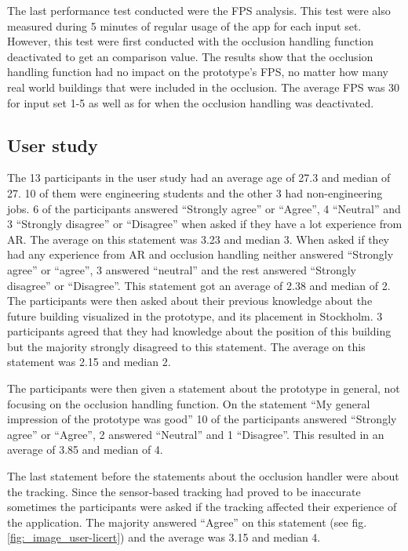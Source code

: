 The last performance test conducted were the FPS analysis. This test were also measured during 5 minutes of regular usage of the app for each input set. However, this test were first conducted with the occlusion handling function deactivated to get an comparison value. The results show that the occlusion handling function had no impact on the prototype's FPS, no matter how many real world buildings that were included in the occlusion. The average FPS was 30 for input set 1-5 as well as for when the occlusion handling was deactivated.

\subsection{User study}

The 13 participants in the user study had an average age of 27.3 and median of 27. 10 of them were engineering students and the other 3 had non-engineering jobs. 6 of the participants answered ``Strongly agree'' or ``Agree'', 4 ``Neutral'' and 3 ``Strongly disagree'' or ``Disagree'' when asked if they have a lot experience from AR. The average on this statement was 3.23 and median 3. When asked if they had any experience from AR and occlusion handling neither answered ``Strongly agree'' or ``agree'', 3 answered ``neutral'' and the rest answered ``Strongly disagree'' or ``Disagree''. This statement got an average of 2.38 and median of 2. The participants were then asked about their previous knowledge about the future building visualized in the prototype, and its placement in Stockholm. 3 participants agreed that they had knowledge about the position of this building but the majority strongly disagreed to this statement. The average on this statement was 2.15 and median 2.

The participants were then given a statement about the prototype in general, not focusing on the occlusion handling function. On the statement ``My general impression of the prototype was good'' 10 of the participants answered ``Strongly agree'' or ``Agree'', 2 answered ``Neutral'' and 1 ``Disagree''. This resulted in an average of 3.85 and median of 4. 

The last statement before the statements about the occlusion handler were about the tracking. Since the sensor-based tracking had proved to be inaccurate sometimes the participants were asked if the tracking affected their experience of the application. The majority answered ``Agree'' on this statement (see fig. \ref{fig:_image_user-licert}) and the average was 3.15 and median 4.

